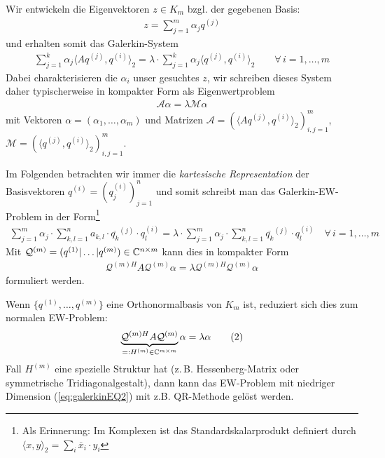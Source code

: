 Wir entwickeln die Eigenvektoren $z\in K_m$ bzgl. der gegebenen Basis:
%
\begin{align*}
  z = \sum_{j=1}^{m} \alpha_j q^{(j)}
\end{align*}
%
und erhalten somit das Galerkin-System
%
\begin{align*}
  \sum_{j=1}^{k} \alpha_j \langle Aq^{(j)},q^{(i)}\rangle_2 
  = \lambda\cdot\sum_{j=1}^{k} \alpha_j \langle q^{(j)},q^{(i)}\rangle_2
  \qquad\forall\,i=1,\dots,m
\end{align*}
Dabei charakterisieren die $\alpha_i$ unser gesuchtes $z$, wir schreiben dieses System daher typischerweise 
in kompakter Form als Eigenwertproblem
%
\begin{align*}
  \mathcal{A}\alpha = \lambda\mathcal{M}\alpha
\end{align*} 
%
mit Vektoren $\alpha=(\alpha_1,\dots,\alpha_m)$ und Matrizen
$\mathcal{A}=(\langle Aq^{(j)}, q^{(i)}\rangle_2)_{i,j=1}^m$, 
$\mathcal{M} = (\langle q^{(j)}, q^{(i)}\rangle_2)_{i,j=1}^m$.

Im Folgenden betrachten wir immer die \textit{kartesische Representation} der Basisvektoren $q^{(i)}=(q_j^{(i)})_{j=1}^n$ 
und somit schreibt man das Galerkin-EW-Problem in der Form\footnote{
  Als Erinnerung: Im Komplexen ist das Standardskalarprodukt definiert durch 
  $\langle x,y\rangle_2 = \sum_i \overline{x}_i\cdot y_i$
}
%
\begin{align*}
  \sum_{j=1}^{m} \alpha_j\cdot \sum_{k,l=1}^{n} a_{k,l}\cdot \overline{q_k}^{(j)}\cdot q^{(i)}_l 
  = \lambda\cdot \sum_{j=1}^{m} \alpha_j \cdot\sum_{k,l=1}^{n}\overline{q_k}^{(j)}\cdot q^{(i)}_l
  \quad\forall\, i=1,\dots,m
\end{align*}
%
Mit $\mathcal{Q}^{(m)}=(q^{(1)}|\dots|q^{(m)})\in\mathbb C^{n\times m}$ kann dies in kompakter Form
%
\begin{align*}
  \mathcal{Q}^{(m)H}A\mathcal{Q}^{(m)}\alpha = \lambda \mathcal{Q}^{(m)H}\mathcal{Q}^{(m)}\alpha
\end{align*}
formuliert werden.

Wenn $\{q^{(1)},\dots,q^{(m)}\}$ eine Orthonormalbasis von $K_m$ ist, reduziert sich dies zum normalen EW-Problem:
%
\begin{align*}
  \underbrace{\mathcal{Q}^{(m)H}A\mathcal{Q}^{(m)}}_{=: H^{(m)}\in\mathbb C^{m\times m}}\alpha 
  = \lambda \alpha 
  \tag{2}\label{eq:galerkinEQ2}
\end{align*}
%
Fall $H^{(m)}$ eine spezielle Struktur hat (z.\,B. Hessenberg-Matrix oder symmetrische Tridiagonalgestalt), dann kann 
das EW-Problem mit niedriger Dimension (\ref{eq:galerkinEQ2}) mit z.B. QR-Methode gelöst werden. 

